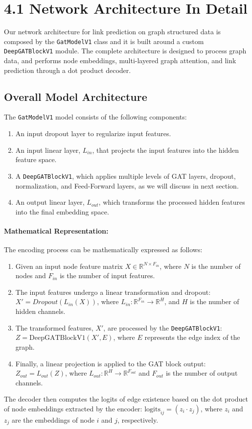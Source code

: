\documentclass{article}
\begin{document}
	\section*{4.1 Network Architecture In Detail}
	
	Our network architecture for link prediction on graph structured data is composed by the \texttt{GatModelV1} class and it is built around a custom \texttt{DeepGATBlockV1} module.
	The complete architecture is designed to process graph data, and performs node embeddings, multi-layered graph attention, and link prediction through a dot product decoder.
	
	\subsection*{Overall Model Architecture}
	
	The \texttt{GatModelV1} model consists of the following components:
	\begin{enumerate}
		\item An input dropout layer to regularize input features.
		\item An input linear layer, $L_{in}$, that projects the input features into the hidden feature space.
		\item A \texttt{DeepGATBlockV1}, which applies multiple levels of GAT layers, dropout, normalization, and Feed-Forward layers, as we will discuss in next section.
		\item An output linear layer, $L_{out}$, which transforms the processed hidden features into the final embedding space.
	\end{enumerate}
	
	\paragraph*{Mathematical Representation:}
	
	The encoding process can be mathematically expressed as follows:
	\begin{enumerate}
		\item Given an input node feature matrix $X \in \mathbb{R}^{N \times F_{in}}$, where $N$ is the number of nodes and $F_{in}$ is the number of input features.
		\item The input features undergo a linear transformation and dropout: $X' = Dropout(L_{in}(X))$, where $L_{in} : \mathbb{R}^{F_{in}} \to \mathbb{R}^{H}$, and $H$ is the number of hidden channels.
		\item The transformed features, $X'$, are processed by the \texttt{DeepGATBlockV1}: $Z = \text{DeepGATBlockV1}(X', E)$, where $E$ represents the edge index of the graph.
		\item Finally, a linear projection is applied to the GAT block output: $Z_{out} = L_{out}(Z)$, where $L_{out}: \mathbb{R}^H \to \mathbb{R}^{F_{out}}$ and $F_{out}$ is the number of output channels.
	\end{enumerate}
	The decoder then computes the logits of edge existence based on the dot product of node embeddings extracted by the encoder: $\text{logits}_{ij} = (z_i \cdot z_j)$, where $z_i$ and $z_j$ are the embeddings of node $i$ and $j$, respectively.
	
\end{document}

